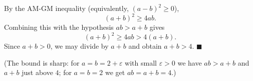 By the AM-GM inequality (equivalently, $(a-b)^2\ge0$),
\[
(a+b)^2\ge4ab .
\]
Combining this with the hypothesis $ab>a+b$ gives
\[
(a+b)^2\ge4ab>4(a+b).
\]
Since $a+b>0$, we may divide by $a+b$ and obtain $a+b>4$. $\blacksquare$

(The bound is sharp: for $a=b=2+\varepsilon$ with small $\varepsilon>0$ we have $ab>a+b$ and $a+b$ just above $4$; for $a=b=2$ we get $ab=a+b=4$.)
